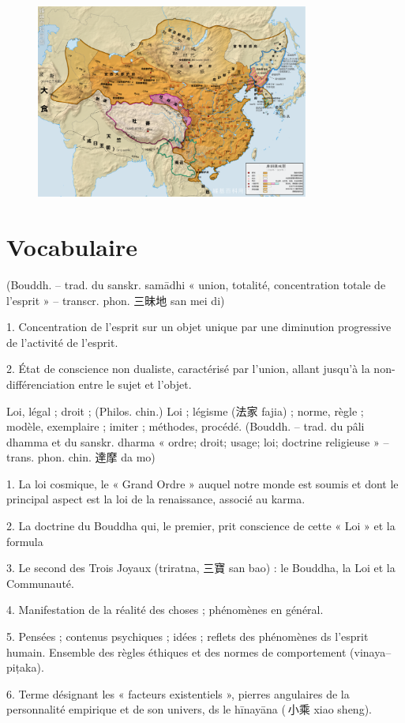 \begin{figure}[!h]
    \centering
    \includegraphics[width=0.8\textwidth]{ConfucianismeTaoismeBouddhismeChinois/Images/Tang.png}
 
    \label{fig:enter-label}
\end{figure} 




\section{Vocabulaire}

\begin{Def}[ ding 定]
    (Bouddh. – trad. du sanskr. samādhi « union, totalité, concentration totale de l’esprit » – transcr. phon. 三昧地 san mei di) 
    
    1. Concentration de l’esprit sur un objet unique par une diminution progressive de l’activité de l’esprit. 
    
    2.  État de conscience non dualiste, caractérisé par l’union, allant jusqu’à la non-différenciation entre le sujet et l’objet. 
\end{Def}
\begin{Def}[fa 法]
    Loi, légal ; droit ; (Philos. chin.) Loi ; légisme (法家 fajia) ; norme, règle ; modèle, exemplaire ; imiter ; méthodes, procédé. (Bouddh. – trad. du pâli dhamma et du sanskr. dharma « ordre; droit; usage; loi; doctrine religieuse » – trans. phon. chin. 達摩 da mo) 
    
    1. La loi cosmique, le « Grand Ordre » auquel notre monde est soumis et dont le principal aspect est la loi de la renaissance, associé au karma. 
    
    2. La doctrine du Bouddha qui, le premier, prit conscience de cette « Loi » et la formula 
    
    3. Le second des Trois Joyaux (triratna, 三寶 san bao) : le Bouddha, la Loi et la Communauté. 
    
    4. Manifestation de la réalité des choses ; phénomènes en général. 
    
    5. Pensées ; contenus psychiques ; idées ; reflets des phénomènes ds l’esprit humain. Ensemble des règles éthiques et des normes de comportement (vinaya–piṭaka).  
    
    6. Terme désignant les « facteurs existentiels », pierres angulaires de la personnalité empirique et de son univers, ds le hīnayāna ( 小乘 xiao sheng).
\end{Def}